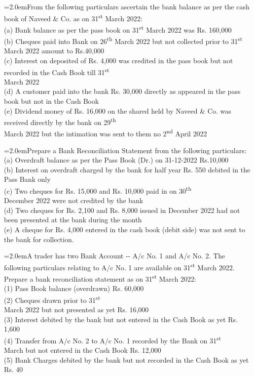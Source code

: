 \documentclass[11pt,a4paper]{article}
\newcommand{\lqn}[2]{\Needspace{6\baselineskip}\par\medskip\noindent\hangindent=2.0em\hangafter=1\makebox[2.0em][l]{\textbf{#1.}}#2\par}
\begin{document}
\lqn{72}{From the following particulars ascertain the bank balance as per the cash book of Naveed \& Co. as on 31\textsuperscript{st}  March 2022:\\
(a) Bank balance as per the pass book on 31\textsuperscript{st} March 2022 was Rs. 160,000\\
(b) Cheques paid into Bank on 26\textsuperscript{th} March 2022 but not collected prior to 31\textsuperscript{st} March 2022 amount to Rs.40,000\\
(c) Interest on deposited of Rs. 4,000 was credited in the pass book but not recorded in the Cash Book till 31\textsuperscript{st}\\
 March 2022\\
(d) A customer paid into the bank Rs. 30,000 directly as appeared in the pass book but not in the Cash Book\\
(e) Dividend money of Rs. 16,000 on the shared held by Naveed \& Co. was received directly by the bank on 29\textsuperscript{th}\\
 March 2022 but the intimation was sent to them no 2\textsuperscript{nd}  April 2022\par
}
\lqn{73}{Prepare a Bank Reconciliation Statement from the following particulars:\\
(a) Overdraft balance as per the Pass Book (Dr.) on 31-12-2022 Rs.10,000\\
(b) Interest on overdraft charged by the bank for half year Rs. 550 debited in the Pass Bank only\\
(c) Two cheques for Rs. 15,000 and Rs. 10,000 paid in on 30\textsuperscript{th}\\
 December 2022 were not credited by the bank\\
(d) Two cheques for Rs. 2,100 and Rs. 8,000 issued in December 2022 had not been presented at the bank during the month\\
(e) A cheque for Rs. 4,000 entered in the cash book (debit side) was not sent to the bank for collection.\par
}
\lqn{74}{A trader has two Bank Account -{}- A/c No. 1 and A/c No. 2. The following particulars relating to A/c No. 1 are available on 31\textsuperscript{st} March 2022. Prepare a bank reconciliation statement as on 31\textsuperscript{st} March 2022:\\
(1) Pass Book balance (overdrawn) Rs. 60,000\\
(2) Cheques drawn prior to 31\textsuperscript{st}\\
 March 2022 but not presented as yet Rs. 16,000\\
(3) Interest debited by the bank but not entered in the Cash Book as yet Rs. 1,600\\
(4) Transfer from A/c No. 2 to A/c No. 1 recorded by the Bank on 31\textsuperscript{st}\\
 March but not entered in the Cash Book Rs. 12,000\\
(5) Bank Charges debited by the bank but not recorded in the Cash Book as yet Rs. 40\par
}
\end{document}
